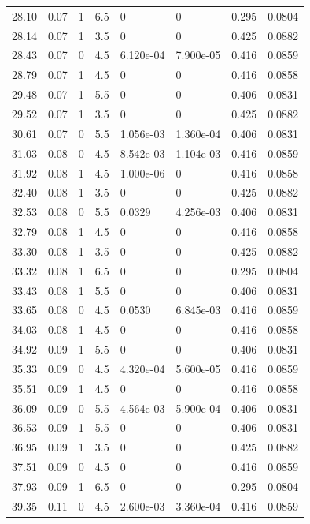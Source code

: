 \documentclass[preview]{standalone}
\begin{document}
{{{\begin{tabular}{L{1.2cm}C{1.2cm} C{0.3cm}C{0.5cm} C{1.4cm}C{1.4cm} C{1.4cm}C{1.4cm}}
  28.10  &  0.07  & 1     & 6.5 &  0  & 0  & 0.295 &  0.0804   \\ 
  28.14  &  0.07  & 1     & 3.5 &  0  & 0  & 0.425 &  0.0882   \\ 
  28.43  &  0.07  & 0     & 4.5 &  6.120e-04  & 7.900e-05  & 0.416 &  0.0859   \\ 
  28.79  &  0.07  & 1     & 4.5 &  0  & 0  & 0.416 &  0.0858   \\ 
  29.48  &  0.07  & 1     & 5.5 &  0  & 0  & 0.406 &  0.0831   \\ 
  29.52  &  0.07  & 1     & 3.5 &  0  & 0  & 0.425 &  0.0882   \\ 
  30.61  &  0.07  & 0     & 5.5 &  1.056e-03  & 1.360e-04  & 0.406 &  0.0831   \\ 
  31.03  &  0.08  & 0     & 4.5 &  8.542e-03  & 1.104e-03  & 0.416 &  0.0859   \\ 
  31.92  &  0.08  & 1     & 4.5 &  1.000e-06  & 0  & 0.416 &  0.0858   \\ 
  32.40  &  0.08  & 1     & 3.5 &  0  & 0  & 0.425 &  0.0882   \\ 
  32.53  &  0.08  & 0     & 5.5 &  0.0329  & 4.256e-03  & 0.406 &  0.0831   \\ 
  32.79  &  0.08  & 1     & 4.5 &  0  & 0  & 0.416 &  0.0858   \\ 
  33.30  &  0.08  & 1     & 3.5 &  0  & 0  & 0.425 &  0.0882   \\ 
  33.32  &  0.08  & 1     & 6.5 &  0  & 0  & 0.295 &  0.0804   \\ 
  33.43  &  0.08  & 1     & 5.5 &  0  & 0  & 0.406 &  0.0831   \\ 
  33.65  &  0.08  & 0     & 4.5 &  0.0530  & 6.845e-03  & 0.416 &  0.0859   \\ 
  34.03  &  0.08  & 1     & 4.5 &  0  & 0  & 0.416 &  0.0858   \\ 
  34.92  &  0.09  & 1     & 5.5 &  0  & 0  & 0.406 &  0.0831   \\ 
  35.33  &  0.09  & 0     & 4.5 &  4.320e-04  & 5.600e-05  & 0.416 &  0.0859   \\ 
  35.51  &  0.09  & 1     & 4.5 &  0  & 0  & 0.416 &  0.0858   \\ 
  36.09  &  0.09  & 0     & 5.5 &  4.564e-03  & 5.900e-04  & 0.406 &  0.0831   \\ 
  36.53  &  0.09  & 1     & 5.5 &  0  & 0  & 0.406 &  0.0831   \\ 
  36.95  &  0.09  & 1     & 3.5 &  0  & 0  & 0.425 &  0.0882   \\ 
  37.51  &  0.09  & 0     & 4.5 &  0  & 0  & 0.416 &  0.0859   \\ 
  37.93  &  0.09  & 1     & 6.5 &  0  & 0  & 0.295 &  0.0804   \\ 
  39.35  &  0.11  & 0     & 4.5 &  2.600e-03  & 3.360e-04  & 0.416 &  0.0859   \\ 
\hline 
\end{tabular} 

}}}
\end{document}
